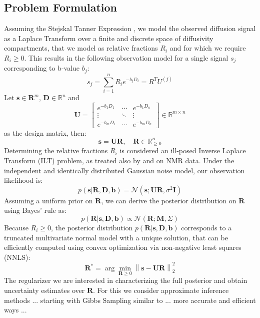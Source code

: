 \documentclass{article}
\begin{document}
\subsection{Problem Formulation}
Assuming the Stejskal Tanner Expression \cite{TBD}, we model the observed diffusion signal as a Laplace Transform over a finite and discrete space of diffusivity compartments, that we model as relative fractions \(R_i\) and for which we require $R_i \ge 0$. This results in the following observation model for a single signal $s_j$ corresponding to b-value $b_j$:
\begin{equation}
 s_j = \sum_{i=1}^n R_i e^{-b_jD_i} = R^T U^{(j)}
\end{equation}  
Let $\mathbf{s} \in \mathbf{R}^{m}$, $\mathbf{D} \in \mathbb{R}^n$ and \[
\mathbf{U} = 
\begin{bmatrix}
e^{-b_1 D_1} & \cdots & e^{-b_1 D_n} \\
\vdots & \ddots & \vdots \\
e^{-b_m D_1} & \cdots & e^{-b_m D_n}
\end{bmatrix}
\in \mathbb{R}^{m \times n}
\] as the design matrix, then:
\begin{equation} 
    \mathbf{s} = \mathbf{U} \mathbf{R}, \quad \mathbf{R} \in \mathbb{R}_{\geq 0}^{n}
\end{equation}
Determining the relative fractions \(R_i\) is considered an ill-posed Inverse Laplace Transform (ILT) problem, as treated also by \cite{berman2013laplace} and \cite{prange2009quantifying} on NMR data. Under the independent and identically distributed Gaussian noise model, our observation likelihood is: 
\begin{equation} 
    p(\mathbf{s}|\mathbf{R},\mathbf{D},\mathbf{b}) = \mathcal{N}(\mathbf{s}; \mathbf{U} \mathbf{R}, \sigma^2 \mathbf{I}) 
\end{equation}
Assuming a uniform prior on $\mathbf{R}$, we can derive the posterior distribution on $\mathbf{R}$ using Bayes' rule as: 
\begin{equation} 
    p(\mathbf{R}|\mathbf{s}, \mathbf{D}, \mathbf{b}) \propto \mathcal{N}(\mathbf{R}; \mathbf{M}, \Sigma) 
\end{equation} 
Because $R_i \ge 0$, the posterior distribution $p(\mathbf{R}|\mathbf{s}, \mathbf{D}, \mathbf{b})$ corresponds to a truncated multivariate normal model with a unique solution, that can be efficiently computed using convex optimization via non-negative least squares (NNLS):
\begin{equation} 
    \mathbf{R}^* = \arg\min_{\mathbf{R} \ge 0} \left \| \mathbf{s} - \mathbf{U} \mathbf{R} \right \|_2^2
\end{equation} 
The regularizer 
we are interested in characterizing the full posterior and obtain uncertainty estimates over $\mathbf{R}$. For this we consider approximate inference methods ... starting with Gibbs Sampling similar to \cite{prange2009quantifying} ... more accurate and efficient ways ...
\end{document}
